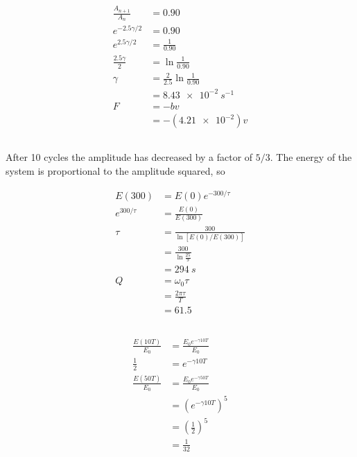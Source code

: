 \documentclass{article}
\begin{document}
\subsection{}

\begin{align*}
  \frac{A_{n + 1}}{A_n} & = 0.90                             \\
  e^{-2.5 \gamma / 2}   & = 0.90                             \\
  e^{2.5 \gamma / 2}    & = \frac{1}{0.90}                   \\
  \frac{2.5 \gamma}{2}  & = \ln \frac{1}{0.90}               \\
  \gamma                & = \frac{2}{2.5} \ln \frac{1}{0.90} \\
                        & = \qty{8.43e-2}{s^{-1}}            \\
  F                     & = -b v                             \\
                        & = -(\num{4.21e-2}) v
\end{align*}

\subsection{}

After 10 cycles the amplitude has decreased by a factor of $5 / 3$. The energy of the system is proportional to the amplitude squared, so

\begin{align*}
  E(300)         & = E(0) e^{-300 / \tau}            \\
  e^{300 / \tau} & = \frac{E(0)}{E(300)}             \\
  \tau           & = \frac{300}{\ln [E(0) / E(300)]} \\
                 & = \frac{300}{\ln \frac{25}{9}}    \\
                 & = \qty{294}{s}                    \\
  Q              & = \omega_0 \tau                   \\
                 & = \frac{2 \pi \tau}{T}            \\
                 & = 61.5
\end{align*}

\subsection{}

\begin{align*}
  \frac{E(10 T)}{E_0} & = \frac{E_0 e^{-\gamma 10 T}}{E_0} \\
  \frac{1}{2}         & = e^{-\gamma 10 T}                 \\
  \frac{E(50 T)}{E_0} & = \frac{E_0 e^{-\gamma 50 T}}{E_0} \\
                      & = (e^{-\gamma 10 T})^5             \\
                      & = \left( \frac{1}{2} \right)^5     \\
                      & = \frac{1}{32}
\end{align*}
\end{document}
